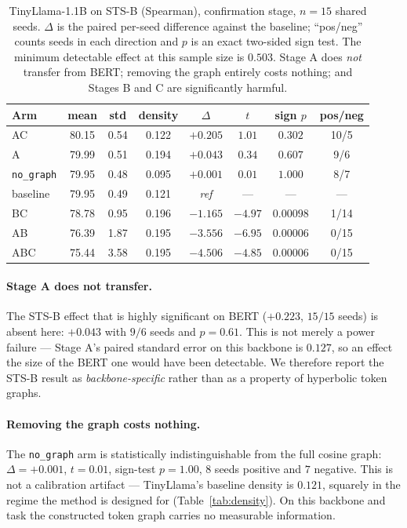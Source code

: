 \documentclass{article} %
\begin{document}
\begin{table}[t]
\caption{TinyLlama-1.1B on STS-B (Spearman), confirmation stage, $n=15$ shared
seeds. $\Delta$ is the paired per-seed difference against the baseline;
``pos/neg'' counts seeds in each direction and $p$ is an exact two-sided sign
test. The minimum detectable effect at this sample size is $0.503$.
Stage A does \emph{not} transfer from BERT; removing the graph entirely costs
nothing; and Stages B and C are significantly harmful.}
\label{tab:decoder}
\begin{center}
\begin{tabular}{lccccccc}
\toprule
Arm & mean & std & density & $\Delta$ & $t$ & sign $p$ & pos/neg \\
\midrule
AC                 & 80.15 & 0.54 & 0.122 & $+0.205$ & $1.01$ & $0.302$ & 10/5 \\
A                  & 79.99 & 0.51 & 0.194 & $+0.043$ & $0.34$ & $0.607$ & \phantom{0}9/6 \\
\texttt{no\_graph} & 79.95 & 0.48 & 0.095 & $+0.001$ & $0.01$ & $1.000$ & \phantom{0}8/7 \\
baseline           & 79.95 & 0.49 & 0.121 & \emph{ref} & --- & --- & --- \\
\midrule
BC                 & 78.78 & 0.95 & 0.196 & $-1.165$ & $-4.97$ & $0.00098$ & \phantom{0}1/14 \\
AB                 & 76.39 & 1.87 & 0.195 & $-3.556$ & $-6.95$ & $0.00006$ & \phantom{0}0/15 \\
ABC                & 75.44 & 3.58 & 0.195 & $-4.506$ & $-4.85$ & $0.00006$ & \phantom{0}0/15 \\
\bottomrule
\end{tabular}
\end{center}
\end{table}

\paragraph{Stage A does not transfer.} The STS-B effect that is highly
significant on BERT ($+0.223$, $15/15$ seeds) is absent here: $+0.043$ with
$9/6$ seeds and $p = 0.61$. This is not merely a power failure --- Stage A's
paired standard error on this backbone is $0.127$, so an effect the size of the
BERT one would have been detectable. We therefore report the STS-B result as
\emph{backbone-specific} rather than as a property of hyperbolic token graphs.

\paragraph{Removing the graph costs nothing.} The \texttt{no\_graph} arm is
statistically indistinguishable from the full cosine graph: $\Delta = +0.001$,
$t = 0.01$, sign-test $p = 1.00$, $8$ seeds positive and $7$ negative. This is
not a calibration artifact --- TinyLlama's baseline density is $0.121$, squarely
in the regime the method is designed for (Table~\ref{tab:density}). On this
backbone and task the constructed token graph carries no measurable
information.
\end{document}
